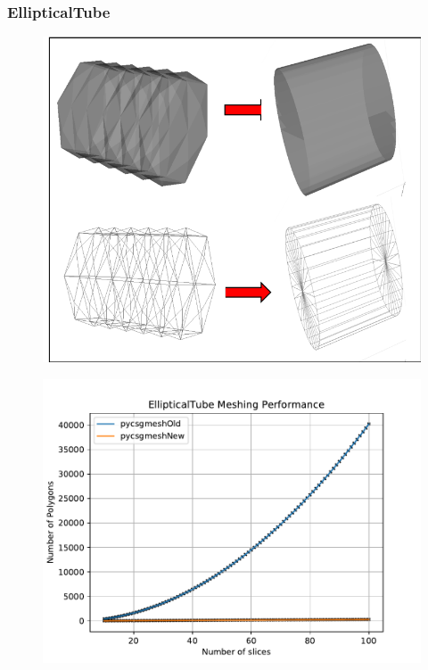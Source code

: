 \documentclass[12pt,a4paper]{article}
\begin{document}
\subsubsection{EllipticalTube}

\begin{figure}[h!]
\centering
\begin{minipage}{.2\textwidth}
  \centering
  \includegraphics[height=0.8\linewidth]{Images//Meshes//ellipticaltube.png}
  \label{fig:test1}
\end{minipage}%
\begin{minipage}{.3\textwidth}
  \centering
  \includegraphics[scale=0.35]{Images//Quad_fits//EllipticalTube_quad.pdf}
  \label{fig:test2}
\end{minipage}%
\end{figure}
\end{document}
